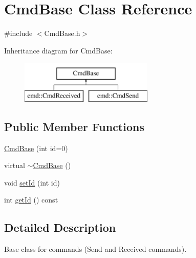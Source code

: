\hypertarget{class_cmd_base}{\section{Cmd\+Base Class Reference}
\label{class_cmd_base}
}


{\ttfamily \#include $<$Cmd\+Base.\+h$>$}

Inheritance diagram for Cmd\+Base\+:\begin{figure}[H]
\begin{center}
\leavevmode
\includegraphics[height=2.000000cm]{class_cmd_base}
\end{center}
\end{figure}
\subsection*{Public Member Functions}
\begin{DoxyCompactItemize}
\item 
\hyperlink{class_cmd_base_a33bf0141fa7a6f77ccfe84d3ce144ca9}{Cmd\+Base} (int id=0)
\item 
virtual \hyperlink{class_cmd_base_a79d89d75709596e426ef412883ba4c91}{$\sim$\+Cmd\+Base} ()
\item 
void \hyperlink{class_cmd_base_ac83aced054abdb8e39b358bf109378d6}{set\+Id} (int id)
\item 
int \hyperlink{class_cmd_base_afcf8a525095025adb2ebf7304511b006}{get\+Id} () const 
\end{DoxyCompactItemize}


\subsection{Detailed Description}
Base class for commands (Send and Received commands). 

